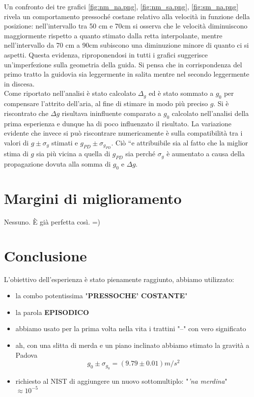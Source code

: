 \documentclass[a4paper,11pt,oneside]{article}
\begin{document}
Un confronto dei tre grafici \ref{fig:nm_na.png}, \ref{fig:nm_sa.png}, \ref{fig:sm_na.png} rivela un comportamento pressoché costane relativo alla velocità in funzione della posizione:  nell'intervallo tra 50 \si{cm} e 70\si{cm} si osserva che le velocità diminuiscono maggiormente rispetto a quanto stimato dalla retta interpolante, mentre nell'intervallo da 70 \si{cm} a 90\si{cm} subiscono una diminuzione minore di quanto ci si aspetti. Questa evidenza, riproponendosi in tutti i grafici suggerisce un'imperfezione sulla geometria della guida. Si pensa che in corrispondenza del primo tratto la guidovia sia leggermente in salita mentre nel secondo leggermente in discesa.\\
Come riportato nell'analisi è stato calcolato $\Delta_g$ ed è stato sommato a $g_0$ per compensare l'attrito dell'aria, al fine di stimare in modo più preciso $g$. Si è riscontrato che $\Delta g$ risultava ininfluente comparato a $g_0$ calcolato nell'analisi della prima esperienza e dunque ha di poco influenzato il risultato. La variazione evidente che invece si può riscontrare numericamente è sulla compatibilità tra i valori di $g \pm \sigma_{g}$ stimati e $g_{PD}\pm \sigma_{g_{PD}}$. Ciò ``e attribuibile sia al fatto che la miglior stima di $g$ sia più vicina a quella di $g_{PD}$ sia perché $\sigma_{g}$ è aumentato a causa della propagazione dovuta alla somma di $g_{0}$ e $\Delta g$.

\section{Margini di miglioramento}
 Nessuno. È già perfetta così. =)


\section{Conclusione}

L'obiettivo dell'esperienza è stato pienamente raggiunto, abbiamo utilizzato:
\begin{itemize}
    \item la combo potentissima "\textbf{PRESSOCHE' COSTANTE}"
    \item la parola \textbf{EPISODICO}
    \item abbiamo usato per la prima volta nella vita i trattini "--" con vero significato 
    \item ah, con una slitta di merda e un piano inclinato abbiamo stimato la gravità a Padova 
        \begin{equation*}
        g_0\pm\sigma_{g_0}=\left ( 9.79 \pm 0.01 \right ) m/s^{2}
        \end{equation*}
    \item richiesto al \textsc{NIST} di aggiungere un nuovo sottomultiplo: "\textit{'na merdina}" $\approx 10^{-5}$
    
\end{itemize}
\end{document}
